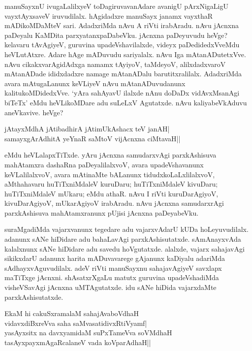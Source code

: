 manuSayxnU ivugaLalilxyeV toDagiruvavanAdare avanigU pArxNigaLigU vayxtAyxsaveV iruvudilalx. hAgidadxre manuSayx janamx vayxthaR 
mADikoMDaMteV sari. AdadxriMda nAvu A riVti irabAradu. nAvu jAcnxna paDeyalu KaMDita parxyatanxpaDabeVku. jAcnxna paDeyuvudu heVge? kelavaru 
tAvAgiyeV, guruvina upadeVshavilalxde, videyx paDedidedxVveMdu heVLutAtxre. Adare hAge mADuvudu sariyalalx. nAvu Iga mAtanADutetxVve. nAvu 
cikakxvarAgidAdxga namamx tAyiyoV, taMdeyoV, alilxdadxvaroV mAtanADade ididxdadxre namage mAtanADalu barutitxralilalx. AdadxriMda 
avara mAtugaLanunx keVLiyeV nAvu mAtanADuvudanunx kalitukoMDidedxVve. `yAra sahAyavU ilalxde nAnu doDaDx vidAvxMsanAgi biTeTx' eMdu 
heVLikoMDare adu suLeLxV Agutatxde. nAvu kaliyabeVkAduvu aneVkavive. heVge?

\begin{shloka}
jAtayxMdhA jAtibadhirA jAtimUkAshacx teV janAH|\\
samayxgArAdhitA yeYnaR saMtoV vijAcnxna ciMtavaH||
\end{shloka}

eMdu heVLalapxTiTxde. yAru jAcnxna samudarxvAgi parxkAshisuva mahAtamxra dashaRna paDeyalilalxvoV, avara upadeVshavanunx keVLalilalxvoV, 
avara mAtinaMte bALanunx tidudxkoLaLxlilalxvoV, aMthahavaru huTiTxniMdaleV kuruDaru; huTiTxniMdaleV kivuDaru; huTiTxniMdaleV 
mUkaru; eMdu athaR. nAvu I riVti kuruDarAgiyoV, kivuDarAgiyoV, mUkarAgiyoV irabAradu. nAvu jAcnxna 
samudarxrAgi parxkAshisuva mahAtamxranunx pUjisi jAcnxna paDeyabeVku.

suraMgadiMda vajarxvanunx tegedare adu vajarxvAdarU kUDa hoLeyuvudilalx. adanunx sANe hiDidare adu bahaLavAgi parxkAshisutatxde. 
sAmAnayxvAda kalalxnunx sANe hiDidare adu savedu hoVgutatxde. alalxde, vajarx sahajavAgi sikikxdarU adanunx harita mADuvavarege gAjanunx 
kaDiyalu adariMda sAdhayxvAguvudilalx. adeV riVti manuSayxnu sahajavAgiyeV savxlapx maTiTxge jAcnxni. shAsatxrXgaLu matutx guruvina 
upadeVshadiMda visheVSavAgi jAcnxna uMTAgutatxde. idu sANe hiDida vajarxdaMte parxkAshisutatxde.

\begin{shloka}
EkaM hi cakuSxramalaM sahajAvaboVdhaH\\
vidavxdiBxreVva saha saMvasatidivxRtiVyamf|\\
yasAyxsitx na davxyamidaM suPxTameVva soV\s MdhaH\\
tasAyxpayxmAgaRcalaneV vada koV\s parAdhaH||
\end{shloka}

